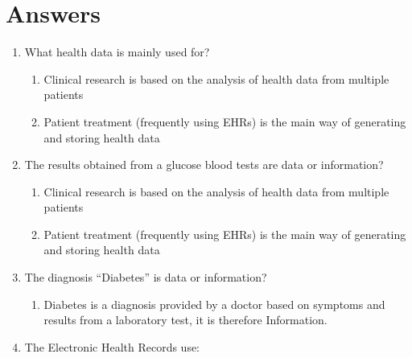 \documentclass[10pt, twoside]{article}   	%
\begin{document}
\section{Answers}        
\renewcommand{\labelenumii}{\alph{enumii}}
      \begin{enumerate}
       \item What health data is mainly used for?
          \begin{enumerate}  
              \item Clinical research is based on the analysis of health data from multiple patients
              \item Patient treatment (frequently using EHRs) is the main way of generating and storing health data
           \end {enumerate}    
       \item The results obtained from a glucose blood tests are data or information?
          \begin{enumerate}  
              \item Clinical research is based on the analysis of health data from multiple patients
              \item Patient treatment (frequently using EHRs) is the main way of generating and storing health data
           \end {enumerate}       
       \item The diagnosis “Diabetes” is data or information?
          \begin{enumerate}  
              \item Diabetes is a diagnosis provided by a doctor based on symptoms and results from a laboratory test, it is therefore Information.
           \end {enumerate}       
       \item The Electronic Health Records use:
          \begin{enumerate}  

\end{enumerate}
\end{enumerate}
\end{document}
